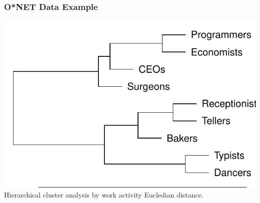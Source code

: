 \documentclass[red]{beamer}
\begin{document}
\begin{frame}
  \frametitle{O*NET Data Example}
  \begin{center}
  \includegraphics[width=\textwidth]{slides/example_cluster.pdf} \\
  Hierarchical cluster analysis by work activity Eucledian distance.
  \end{center}
\end{frame}
\end{document}
